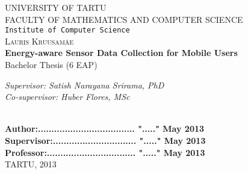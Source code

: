 \begin{titlepage}

\begin{center}



\textsc{UNIVERSITY OF TARTU}\\

\textsc{FACULTY OF MATHEMATICS AND COMPUTER SCIENCE}\\

\texttt{Institute of Computer Science}\\[5cm]

\textsc{ \large Lauris Kruusamäe}\\[0.5cm]
{\Huge \bfseries Energy-aware Sensor Data Collection for Mobile Users}\\[0.5cm]
{\large Bachelor Thesis (6 EAP)}\\[3cm]



\begin{minipage}{0.8\textwidth}
\begin{flushright} \large
\emph{Supervisor: Satish Narayana Srirama, PhD}  \\	  %
\emph{Co-supervisor: Huber Flores, MSc}  %
\end{flushright}
\end{minipage}

\textbf{}\\[1.0cm]

\textbf{Author:.................................... "....." May   2013}\\[0.5cm]

\textbf{Supervisor:............................... "....." May   2013}\\[0.5cm]

\textbf{Professor:................................. "....." May   2013}\\[0.5cm]        

\vfill
{\large TARTU, 2013}

\end{center}

\end{titlepage}

